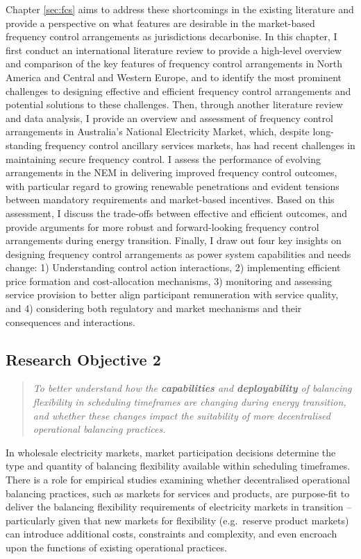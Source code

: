 \documentclass[12pt,a4paper,]{report}
\begin{document}
Chapter \ref{sec:fcs} aims to address these shortcomings in the existing
literature and provide a perspective on what features are desirable in
the market-based frequency control arrangements as jurisdictions
decarbonise. In this chapter, I first conduct an international
literature review to provide a high-level overview and comparison of the
key features of frequency control arrangements in North America and
Central and Western Europe, and to identify the most prominent
challenges to designing effective and efficient frequency control
arrangements and potential solutions to these challenges. Then, through
another literature review and data analysis, I provide an overview and
assessment of frequency control arrangements in Australia's National
Electricity Market, which, despite long-standing frequency control
ancillary services markets, has had recent challenges in maintaining
secure frequency control. I assess the performance of evolving
arrangements in the NEM in delivering improved frequency control
outcomes, with particular regard to growing renewable penetrations and
evident tensions between mandatory requirements and market-based
incentives. Based on this assessment, I discuss the trade-offs between
effective and efficient outcomes, and provide arguments for more robust
and forward-looking frequency control arrangements during energy
transition. Finally, I draw out four key insights on designing frequency
control arrangements as power system capabilities and needs change: 1)
Understanding control action interactions, 2) implementing efficient
price formation and cost-allocation mechanisms, 3) monitoring and
assessing service provision to better align participant remuneration
with service quality, and 4) considering both regulatory and market
mechanisms and their consequences and interactions.

\hypertarget{research-objective-2}{%
\subsection{Research Objective 2}\label{research-objective-2}}

\begin{quote}
\emph{To better understand how the \textbf{capabilities} and
\textbf{deployability} of balancing flexibility in scheduling timeframes
are changing during energy transition, and whether these changes impact
the suitability of more decentralised operational balancing practices.}
\end{quote}

In wholesale electricity markets, market participation decisions
determine the type and quantity of balancing flexibility available
within scheduling timeframes. There is a role for empirical studies
examining whether decentralised operational balancing practices, such as
markets for services and products, are purpose-fit to deliver the
balancing flexibility requirements of electricity markets in transition
-- particularly given that new markets for flexibility (e.g.~reserve
product markets) can introduce additional costs, constraints and
complexity, and even encroach upon the functions of existing operational
practices.
\end{document}
